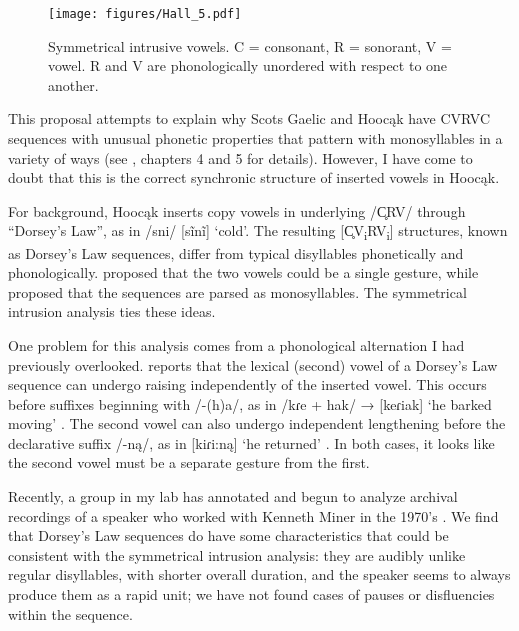 \documentclass[output=paper,colorlinks,citecolor=brown]{langscibook}
\begin{document}
\begin{figure}
\caption{Symmetrical intrusive vowels. C = consonant, R = sonorant, V = vowel. R and V are phonologically unordered with respect to one another. }
\texttt{[image: figures/Hall\_5.pdf]}
\label{fig5}
\end{figure}


This proposal attempts to explain why Scots Gaelic and Hoocąk have CVRVC sequences with unusual phonetic properties that pattern with monosyllables in a variety of ways (see \cite{Hall:2003}, chapters 4 and 5 for details). However, I have come to doubt that this is the correct synchronic structure of inserted vowels in Hoocąk. 

For background, Hoocąk inserts copy vowels in underlying /C̥RV/ through “Dorsey’s Law”, as in /sni/ [s\~in\~i] ‘cold’. The resulting [C̥V\textsubscript{i}RV\textsubscript{i}] structures, known as Dorsey’s Law sequences, differ from typical disyllables phonetically and phonologically. \citet{steriade1990gestures} proposed that the two vowels could be a single gesture, while \citet{alderete1995winnebago} proposed that the sequences are parsed as monosyllables. The symmetrical intrusion analysis ties these ideas. 

One problem for this analysis comes from a phonological alternation I had previously overlooked. \citet{susman1943accentual} reports that the lexical (second) vowel of a Dorsey’s Law sequence can undergo raising independently of the inserted vowel. This occurs before suffixes beginning with /-(h)a/, as in /kɾe + hak/ → [keɾiak] ‘he barked moving’ \citep[75]{susman1943accentual}. The second vowel can also undergo independent lengthening before the declarative suffix /-ną/, as in [kiɾi:ną] ‘he returned’ \citep[14]{susman1943accentual}. In both cases, it looks like the second vowel must be a separate gesture from the first. 

Recently, a group in my lab has annotated and begun to analyze archival recordings of a speaker who worked with Kenneth Miner in the 1970’s \citep{hall2019annotating}. We find that Dorsey’s Law sequences do have some characteristics that could be consistent with the symmetrical intrusion analysis: they are audibly unlike regular disyllables, with shorter overall duration, and the speaker seems to always produce them as a rapid unit; we have not found cases of pauses or disfluencies within the sequence. 
\end{document}
